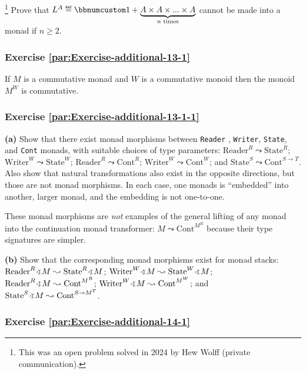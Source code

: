 \footnote{This was an open problem solved in 2024 by Hew Wolff (private communication).}
Prove that $L^{A}\triangleq\bbnum 1+\underbrace{A\times A\times...\times A}_{n\text{ times}}$
cannot be made into a monad if $n\ge2$.

\subsubsection{Exercise \label{par:Exercise-additional-13-1}\ref{par:Exercise-additional-13-1}}

If $M$ is a commutative monad and $W$ is a commutative monoid then
the monoid $M^{W}$ is commutative.

\subsubsection{Exercise \label{par:Exercise-additional-13-1-1}\ref{par:Exercise-additional-13-1-1}}

\textbf{(a)} Show that there exist monad morphisms between \lstinline!Reader!
, \lstinline!Writer!, \lstinline!State!, and \lstinline!Cont! monads,
with suitable choices of type parameters: $\text{Reader}^{R}\leadsto\text{State}^{R}$;
$\text{Writer}^{W}\leadsto\text{State}^{W}$; $\text{Reader}^{R}\leadsto\text{Cont}^{R}$;
$\text{Writer}^{W}\leadsto\text{Cont}^{W}$; and $\text{State}^{S}\leadsto\text{Cont}^{S\rightarrow T}$.
Also show that natural transformations also exist in the opposite
directions, but those are not monad morphisms. In each case, one monads
is \textsf{``}embedded\textsf{''} into another, larger monad, and the embedding is
not one-to-one.

These monad morphisms are \emph{not} examples of the general lifting
of any monad into the continuation monad transformer: $M\leadsto\text{Cont}^{M^{R}}$
because their type signatures are simpler.

\textbf{(b)} Show that the corresponding monad morphisms exist for
monad stacks: $\text{Reader}^{R}\varangle M\leadsto\text{State}^{R}\varangle M$;
$\text{Writer}^{W}\varangle M\leadsto\text{State}^{W}\varangle M$;
$\text{Reader}^{R}\varangle M\leadsto\text{Cont}^{M^{R}}$; $\text{Writer}^{W}\varangle M\leadsto\text{Cont}^{M^{W}}$;
and $\text{State}^{S}\varangle M\leadsto\text{Cont}^{S\rightarrow M^{T}}$.

\subsubsection{Exercise \label{par:Exercise-additional-14-1}\ref{par:Exercise-additional-14-1}}

